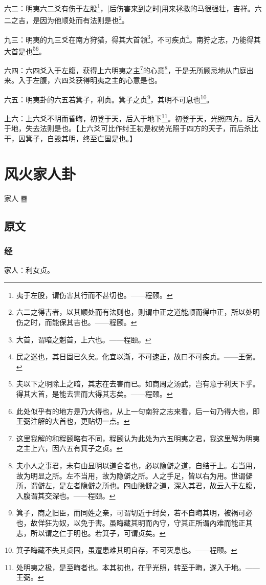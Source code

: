 \documentclass[12pt,oneside]{book}
\begin{document}
六二：明夷六二爻有伤于左股\footnote{夷于左股，谓伤害其行而不甚切也。——程颐。}，[后伤害来到之时]用来拯救的马很强壮，吉祥。六二之吉，是因为他顺处而有法则是也\footnote{六二之得吉者，以其顺处而有法则也，则谓中正之道能顺而得中正，所以处明伤之时，而能保其吉也。——程颐。}。

九三：明夷的九三爻在南方狩猎，得其大首领\footnote{大首，谓暗之魁首，上六也。——程颐。}，不可疾贞\footnote{民之迷也，其日固已久矣。化宜以渐，不可速正，故曰不可疾贞。——王弼。}。南狩之志，乃能得其大首是也\footnote{夫以下之明除上之暗，其志在去害而已。如商周之汤武，岂有意于利天下乎。得其大首，是能去害而大得其志矣。——程颐。}\footnote{此处似乎有的地方是乃大得也，从上一句南狩之志来看，后一句乃得大也，即王弼注解的大首也，更贴切一点。}。

六四：六四爻入于左腹，获得上六明夷之主\footnote{这里我解的和程颐略有不同，程颐认为此处为六五明夷之君，我这里解为明夷之主上六，因六五有箕子之贞。}的心意\footnote{夫小人之事君，未有由显明以道合者也，必以隐僻之道，自结于上。右当用，故为明显之所。左不当用，故为隐僻之所。人之手足，皆以右为用。世谓僻所，谓僻左，是左者隐僻之所也。四由隐僻之道，深入其君，故云入于左腹，入腹谓其交深也。——程颐。}，于是无所顾忌地从门庭出来。入于左腹，六四爻获得明夷之主的心意是也。

六五：明夷卦的六五若箕子，利贞。箕子之贞\footnote{箕子，商之旧臣，而同姓之亲，可谓切近于纣矣，若不自晦其明，被祸可必也，故佯狂为奴，以免于害。虽晦藏其明而內守，守其正所谓內难而能正其志，所以谓之仁于明也。若箕子，可谓贞矣。}，其明不可息也\footnote{箕子晦藏不失其贞固，虽遭患难其明自存，不可灭息也。——程颐。}。

上六：上六爻不明而昏晦，初登于天，后入于地下\footnote{处明夷之极，是至晦者也。本其初也，在乎光照，转至于晦，遂入于地。——王弼。}。初登于天，光照四方。后入于地，失去法则是也。【上六爻可比作纣王初是权势光照于四方的天子，而后杀比干，囚箕子，自毁其明，终至亡国是也。】


\chapter{风火家人卦}
家人 {\Large ䷤}

\section{原文}

\subsection{经}
家人：利女贞。
\end{document}
